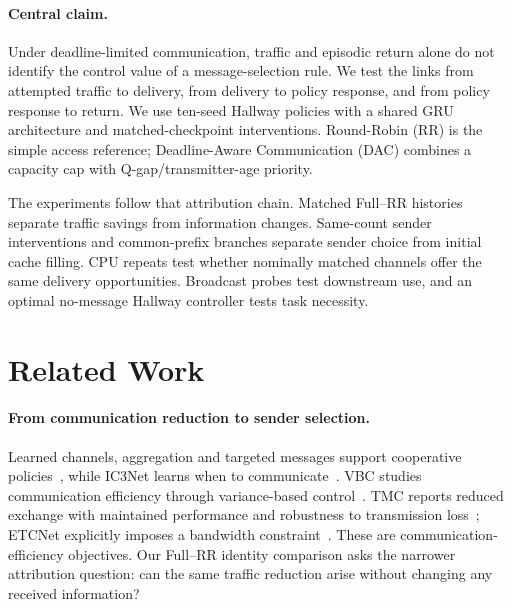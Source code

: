 \documentclass[10pt]{article}
\begin{document}
\paragraph{Central claim.}
Under deadline-limited communication, traffic and episodic return alone do not identify the control value of a message-selection rule. We test the links from attempted traffic to delivery, from delivery to policy response, and from policy response to return. We use ten-seed Hallway policies with a shared GRU architecture and matched-checkpoint interventions. Round-Robin (RR) is the simple access reference; Deadline-Aware Communication (DAC) combines a capacity cap with Q-gap/transmitter-age priority.

The experiments follow that attribution chain. Matched Full--RR histories separate traffic savings from information changes. Same-count sender interventions and common-prefix branches separate sender choice from initial cache filling. CPU repeats test whether nominally matched channels offer the same delivery opportunities. Broadcast probes test downstream use, and an optimal no-message Hallway controller tests task necessity.

\newpage
\vspace*{-2.5\baselineskip}\vspace*{-6pt}\vspace*{-7mm}
\enlargethispage{2mm}
\section{Related Work}
\paragraph{From communication reduction to sender selection.}
Learned channels, aggregation and targeted messages support cooperative policies~\citep{foerster2016learning,sukhbaatar2016learning,das2019tarmac}, while IC3Net learns when to communicate~\citep{singh2019learning}. VBC studies communication efficiency through variance-based control~\citep{zhang2019efficient}. TMC reports reduced exchange with maintained performance and robustness to transmission loss~\citep{zhang2020succinct}; ETCNet explicitly imposes a bandwidth constraint~\citep{hu2023event}. These are communication-efficiency objectives. Our Full--RR identity comparison asks the narrower attribution question: can the same traffic reduction arise without changing any received information?
\end{document}
